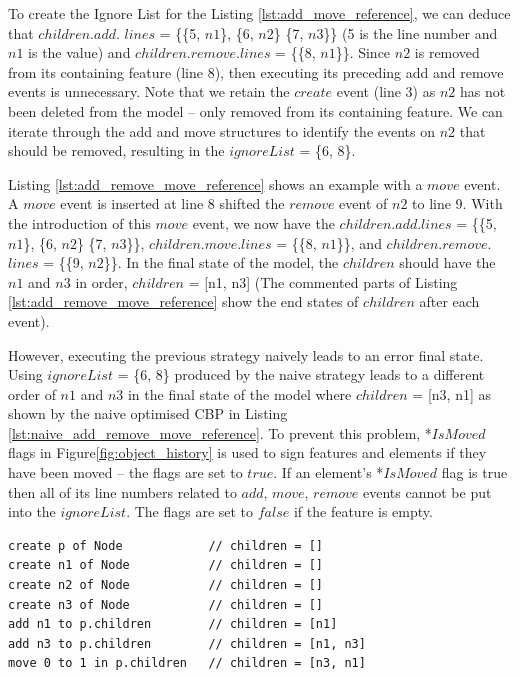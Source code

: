 \documentclass{llncs}
\begin{document}
{    To create the Ignore List for the Listing \ref{lst:add_move_reference}, we can deduce that $children$.$add$. $lines$ = \{\{5, $n1$\}, \{6, $n2$\} \{7, $n3$\}\} (5 is the line number and $n1$ is the value) and $children$.$remove$.$lines$ = \{\{8, $n1$\}\}. Since $n2$ is removed from its containing feature (line 8), then executing its preceding add and remove events is unnecessary. Note that we retain the $create$ event (line 3) as $n2$ has not been deleted from the model -- only removed from its containing feature. We can iterate through the add and move structures to identify the events on $n2$ that should be removed, resulting in the $ignoreList$ = \{6, 8\}.
    
    Listing \ref{lst:add_remove_move_reference} shows an example with a $move$ event. A $move$ event is inserted at line 8 shifted the $remove$ event of $n2$ to line 9. With the introduction of this $move$ event, we now have the $children$.$add$.$lines$ = \{\{5, $n1$\}, \{6, $n2$\} \{7, $n3$\}\}, $children$.$move$.$lines$ = \{\{8, $n1$\}\}, and $children$.$remove$.$lines$ = \{\{9, $n2$\}\}. In the final state of the model, the $children$ should have the $n1$ and $n3$ in order, $children$ = [n1, n3] (The commented parts of Listing \ref{lst:add_remove_move_reference} show the end states of $children$ after each event).  
    
    However, executing the previous strategy naively leads to an error final state. Using $ignoreList$ = \{6, 8\} produced by the naive strategy leads to a different order of $n1$ and $n3$ in the final state of the model where $children$ = [n3, n1] as shown by the naive optimised CBP in Listing \ref{lst:naive_add_remove_move_reference}. To prevent this problem, *$IsMoved$ flags in Figure\ref{fig:object_history} is used to sign  features and elements if they have been moved -- the flags are set to $true$. If an element's *$IsMoved$ flag is true then all of its line numbers related to $add$, $move$, $remove$ events cannot be put into the $ignoreList$. The flags are set to $false$ if the feature is empty. 

\begin{lstlisting}[style=eol,caption={A naive optimised CBP representation of original CBP representation in Listing \ref{lst:add_remove_move_reference} .},label=lst:naive_add_remove_move_reference]
create p of Node            // children = []
create n1 of Node           // children = []
create n2 of Node           // children = []
create n3 of Node           // children = []
add n1 to p.children        // children = [n1]
add n3 to p.children        // children = [n1, n3]
move 0 to 1 in p.children   // children = [n3, n1]
\end{lstlisting}

}
\end{document}
